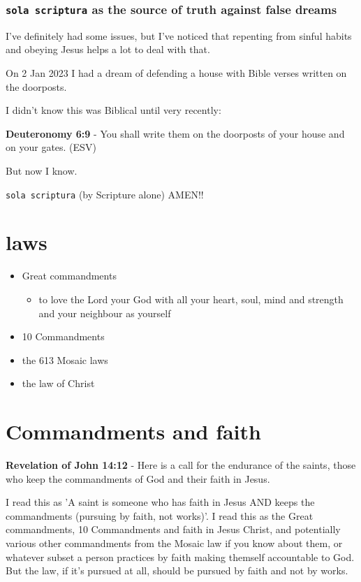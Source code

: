 \documentclass[11pt]{article}
\begin{document}
\subsubsection{\texttt{sola scriptura} as the source of truth against false dreams}
\label{sec:org6acc55a}
I've definitely had some issues, but I've noticed that repenting from sinful habits and obeying Jesus helps a lot to deal with that.

On 2 Jan 2023 I had a dream of defending a house with Bible verses written
on the doorposts.

I didn't know this was Biblical until very recently:

\textbf{Deuteronomy 6:9} -  You shall write them on the doorposts of your house and on your gates.  (ESV)

But now I know.

\texttt{sola scriptura} (by Scripture alone) AMEN!!

\section{laws}
\label{sec:org0532cd6}
\begin{itemize}
\item Great commandments
\begin{itemize}
\item to love the Lord your God with all your heart, soul, mind and strength and your neighbour as yourself
\end{itemize}
\item 10 Commandments
\item the 613 Mosaic laws
\item the law of Christ
\end{itemize}

\section{Commandments and faith}
\label{sec:org6ef2d4a}
\textbf{Revelation of John 14:12} - Here is a call for the endurance of the saints, those who keep the commandments of God and their faith in Jesus.

I read this as 'A saint is someone who has faith in Jesus AND keeps the commandments (pursuing by faith, not works)'.
I read this as the Great commandments, 10 Commandments and faith in Jesus Christ, and potentially various other commandments from the Mosaic law if you know about them, or whatever subset a person practices by faith making themself accountable to God.
But the law, if it's pursued at all, should be pursued by faith and not by works.
\end{document}
